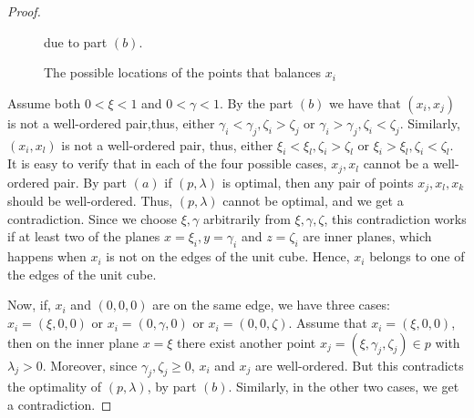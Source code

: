 \documentclass[10pt,a4paper]{amsart}
\begin{document}
\begin{proof}
\begin{figure}[ht]
        \caption{The possible locations of the points that balances \(x_i\)} due to part \((b)\).
        \label{fig:(c)}
\end{figure}
 
Assume both \(0<\xi<1\) and \(0<\gamma<1\). By the part \((b)\) we have that \((x_i,x_j)\) is not a well-ordered pair,thus, either \(\gamma_i< \gamma_j, \zeta_i > \zeta_j\) or \(\gamma_i> \gamma_j, \zeta_i < \zeta_j\). Similarly, \((x_i,x_l)\) is not a well-ordered pair, thus, either \(\xi_i< \xi_l, \zeta_i > \zeta_l\) or \(\xi_i> \xi_l, \zeta_i < \zeta_l\). It is easy to verify that in each of the four possible cases, \(x_j,x_l\) cannot be a well-ordered pair. By part \((a)\) if \((p,\lambda)\) is optimal, then any pair of points \(x_j,x_l,x_k\) should be well-ordered. Thus, \((p,\lambda)\) cannot be optimal, and we get a contradiction.
Since we choose \(\xi,\gamma\) arbitrarily from \(\xi,\gamma,\zeta\), this contradiction works if at least two of the planes \(x=\xi_i,y=\gamma_i\) and \(z=\zeta_i\) are inner planes, which happens when \(x_i\) is not on the edges of the unit cube.
Hence, \(x_i\) belongs to one of the edges of the unit cube. 

Now, if, \(x_i\) and \((0,0,0)\) are on the same edge, we have three cases: \(x_i=(\xi,0,0)\) or \(x_i=(0,\gamma,0)\) or \(x_i=(0,0,\zeta)\). Assume that \(x_i=(\xi,0,0)\), then on the inner plane \(x=\xi\) there exist another point \(x_j=(\xi,\gamma_j,\zeta_j) \in p\) with \(\lambda_j>0\). Moreover, since \(\gamma_j,\zeta_j \ge 0\), \(x_i\) and \(x_j\) are well-ordered. But this contradicts the optimality of \((p,\lambda)\), by part \((b)\). Similarly, in the other two cases, we get a contradiction.


\end{proof}
\end{document}
